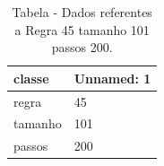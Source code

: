 \begin{table}[H]
\centering
\caption{Tabela - Dados referentes a Regra 45 tamanho 101 passos 200.}
\label{tab:regra_45_tamanho_101_passos_200}
\begin{tabular}{ll}
\toprule
classe & Unnamed: 1 \\
\midrule
regra & 45 \\
tamanho & 101 \\
passos & 200 \\
\bottomrule
\end{tabular}

\end{table}
